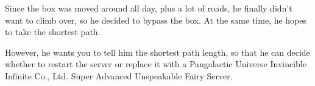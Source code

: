 Since the box was moved around all day, plus a lot of roads, he finally didn't want to climb over, so he decided to bypass the box. At the same time, he hopes to take the shortest path.

However, he wants you to tell him the shortest path length, so that he can decide whether to restart the server or replace it with a Pangalactic Universe Invincible Infinite Co., Ltd. Super Advanced Unspeakable Fairy Server.

